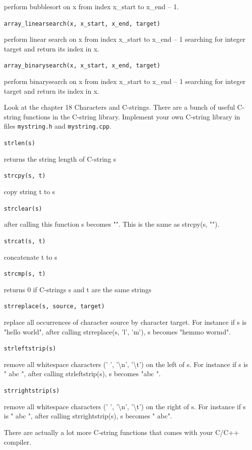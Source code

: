 perform bubblesort on x from index x\_start to x\_end -- 1.

\texttt{array\_linearsearch(x, x\_start, x\_end, target)}

perform linear search on x from index x\_start to x\_end -- 1 searching
for integer target and return its index in x.

\texttt{array\_binarysearch(x, x\_start, x\_end, target)}

perform binarysearch on x from index x\_start to x\_end -- 1 searching
for integer target and return its index in x.

\newpage{}

Look at the chapter 18 Characters and C-strings. There are a bunch of
useful C-string functions in the C-string library. Implement your own
C-string library in files \texttt{mystring.h} and \texttt{mystring.cpp}.

\texttt{strlen(s)}

returns the string length of C-string s

\texttt{strcpy(s, t)}

copy string t to s

\texttt{strclear(s)}

after calling this function s becomes "". This is the same as strcpy(s,
"").

\texttt{strcat(s, t)}

concatenate t to s

\texttt{strcmp(s, t)}

returns 0 if C-strings s and t are the same strings

\texttt{strreplace(s, source, target)}

replace all occurrences of character source by character target. For
instance if s is "hello world", after calling strreplace(s,
'l', 'm'),
s becomes "hemmo wormd".

\texttt{strleftstrip(s)}

remove all whitespace characters (' ',
'\textbackslash n',
'\textbackslash t') on the left of s. For
instance if s is " abc ", after calling strleftstrip(s), s becomes "abc
".

\texttt{strrightstrip(s)}

remove all whitespace characters (' ',
'\textbackslash n',
'\textbackslash t') on the right of s. For
instance if s is " abc ", after calling strrightstrip(s), s becomes "
abc".

There are actually a lot more C-string functions that comes with your
C/C++ compiler.

